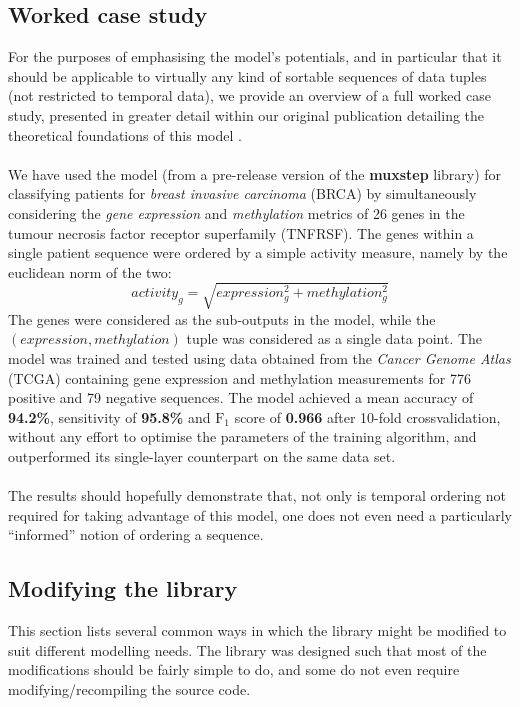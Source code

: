 \documentclass[12pt,openany]{article}
\begin{document}
	\subsection{Worked case study}\label{sec:study}
	For the purposes of emphasising the model's potentials, and in particular that it should be applicable to virtually any kind of sortable sequences of data tuples (not restricted to temporal data), we provide an overview of a full worked case study, presented in greater detail within our original publication detailing the theoretical foundations of this model \cite{Velickovic15}.\\ \\
	We have used the model (from a pre-release version of the {\bf muxstep} library) for classifying patients for \emph{breast invasive carcinoma} (BRCA) by simultaneously considering the \emph{gene expression} and \emph{methylation} metrics of 26 genes in the tumour necrosis factor receptor superfamily (TNFRSF). The genes within a single patient sequence were ordered by a simple activity measure, namely by the euclidean norm of the two:
\begin{equation}
	activity_g = \sqrt{expression_g^2 + methylation_g^2}	
\end{equation}
The genes were considered as the sub-outputs in the model, while the $(expression, methylation)$ tuple was considered as a single data point. The model was trained and tested using data obtained from the \emph{Cancer Genome Atlas} (TCGA) containing gene expression and methylation measurements for 776 positive and 79 negative sequences. The model achieved a mean accuracy of {\bf 94.2\%}, sensitivity of {\bf 95.8\%} and $\text{F}_1$ score of {\bf 0.966} after 10-fold crossvalidation, without any effort to optimise the parameters of the training algorithm, and outperformed its single-layer counterpart on the same data set.\\ \\
The results should hopefully demonstrate that, not only is temporal ordering not required for taking advantage of this model, one does not even need a particularly ``informed'' notion of ordering a sequence.
	\subsection{Modifying the library}\label{sec:mod}
	This section lists several common ways in which the library might be modified to suit different modelling needs. The library was designed such that most of the modifications should be fairly simple to do, and some do not even require modifying/recompiling the source code.
\end{document}
